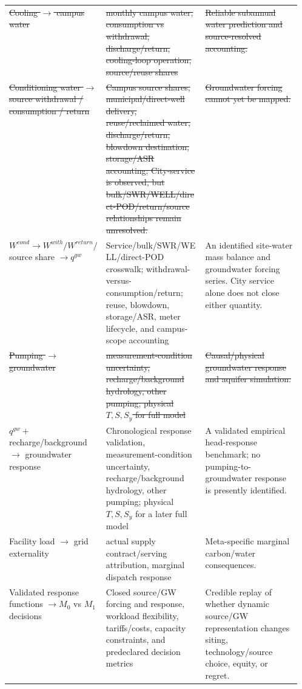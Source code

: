 \documentclass[11pt]{article}
\newcommand{\oldtxt}[1]{\textcolor{blue!70!black}{\sout{#1}}}
\newcommand{\latesttxt}[1]{\textcolor{purple!85!black}{#1}}
\begin{document}
\begin{center}
\begin{tabularx}{\linewidth}{@{}p{0.22\linewidth}p{0.34\linewidth}Y@{}}
\oldtxt{Cooling \(\rightarrow\) campus water} & \oldtxt{monthly campus water, consumption vs withdrawal, discharge/return, cooling-loop operation, source/reuse shares} & \oldtxt{Reliable subannual water prediction and source-resolved accounting.} \\
\oldtxt{Conditioning water \(\rightarrow\) source withdrawal / consumption / return} & \oldtxt{Campus source shares, municipal/direct-well delivery, reuse/reclaimed water, discharge/return, blowdown destination, storage/ASR accounting; City-service is observed, but bulk/SWR/WELL/direct-POD/return/source relationships remain unresolved.} & \oldtxt{Groundwater forcing cannot yet be mapped.} \\
\latesttxt{\(W^{cond}\rightarrow W^{with}/W^{return}/\)source share \(\rightarrow q^{gw}\)} & \latesttxt{Service/bulk/SWR/WELL/direct-POD crosswalk; withdrawal-versus-consumption/return; reuse, blowdown, storage/ASR, meter lifecycle, and campus-scope accounting} & \latesttxt{An identified site-water mass balance and groundwater forcing series. City service alone does not close either quantity.} \\
\oldtxt{Pumping \(\rightarrow\) groundwater} & \oldtxt{measurement-condition uncertainty, recharge/background hydrology, other pumping; physical \(T,S,S_y\) for full model} & \oldtxt{Causal/physical groundwater response and aquifer simulation.} \\
\latesttxt{\(q^{gw}+\) recharge/background \(\rightarrow\) groundwater response} & \latesttxt{Chronological response validation, measurement-condition uncertainty, recharge/background hydrology, other pumping; physical \(T,S,S_y\) for a later full model} & \latesttxt{A validated empirical head-response benchmark; no pumping-to-groundwater response is presently identified.} \\
Facility load \(\rightarrow\) grid externality & actual supply contract/serving attribution, marginal dispatch response & Meta-specific marginal carbon/water consequences. \\
\latesttxt{Validated response functions \(\rightarrow M_0\) vs \(M_1\) decisions} & \latesttxt{Closed source/GW forcing and response, workload flexibility, tariffs/costs, capacity constraints, and predeclared decision metrics} & \latesttxt{Credible replay of whether dynamic source/GW representation changes siting, technology/source choice, equity, or regret.} \\
\bottomrule
\end{tabularx}
\par{}\end{center}
\end{document}
